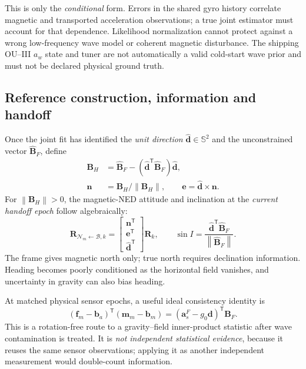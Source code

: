 \documentclass[conference]{IEEEtran}
\DeclareRobustCommand{\vct}[1]{\bm{#1}}
\DeclareRobustCommand{\mat}[1]{\bm{#1}}
\newcommand{\T}{^{\mathsf T}}
\newcommand{\norm}[1]{\left\lVert#1\right\rVert}
\begin{document}
This is only the \emph{conditional} form.  Errors in the shared gyro
history correlate magnetic and transported acceleration observations;
a true joint estimator must account for that dependence.  Likelihood
normalization cannot protect against a wrong low-frequency wave model
or coherent magnetic disturbance.  The shipping OU--III $a_w$ state
and tuner are not automatically a valid cold-start wave prior and must
not be declared physical ground truth.

\subsection{Reference construction, information and handoff}

Once the joint fit has identified the \emph{unit direction}
$\hat{\vct d}\in\mathbb S^2$ and the unconstrained vector
$\hat{\vct B}_F$, define
\begin{align}
\vct B_H&=\hat{\vct B}_F
  -(\hat{\vct d}\T\hat{\vct B}_F)\hat{\vct d},\\
\vct n&=\vct B_H/\norm{\vct B_H},\qquad
\vct e=\hat{\vct d}\times\vct n.
\end{align}
For $\norm{\vct B_H}>0$, the magnetic-NED attitude and inclination
at the \emph{current handoff epoch} follow algebraically:
\begin{equation}
\mat R_{\mathcal N_m\leftarrow\mathcal B,k}
 =\begin{bmatrix}\vct n\T\\\vct e\T\\\hat{\vct d}\T\end{bmatrix}
  \mat R_k,\qquad
\sin I=\frac{\hat{\vct d}\T\hat{\vct B}_F}{\norm{\hat{\vct B}_F}}.
\label{eq:joint-magnetic-ned}
\end{equation}
The frame gives magnetic north only; true north requires declination
information.  Heading becomes poorly conditioned as the horizontal
field vanishes, and uncertainty in gravity can also bias heading.

At matched physical sensor epochs, a useful ideal consistency identity is
\begin{equation}
(\vct f_m-\vct b_a)\T(\vct m_m-\vct b_m)
 =(\vct a_s^F-g_0\vct d)\T\vct B_F.
\label{eq:joint-scalar-dip}
\end{equation}
This is a rotation-free route to a gravity--field inner-product
statistic after wave contamination is treated.  It is \emph{not
independent statistical evidence}, because it reuses the same sensor
observations; applying it as another independent measurement would
double-count information.
\end{document}
